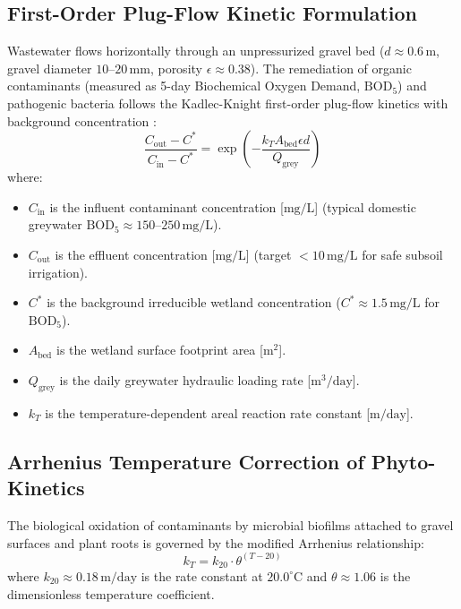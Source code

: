 \subsection{First-Order Plug-Flow Kinetic Formulation}

Wastewater flows horizontally through an unpressurized gravel bed ($d \approx 0.6\,\mathrm{m}$, gravel diameter $10$--$20\,\mathrm{mm}$, porosity $\epsilon \approx 0.38$). The remediation of organic contaminants (measured as 5-day Biochemical Oxygen Demand, $\mathrm{BOD}_5$) and pathogenic bacteria follows the Kadlec-Knight first-order plug-flow kinetics with background concentration \cite{kadlec2008treatment}:
\begin{equation}
\frac{C_{\mathrm{out}} - C^*}{C_{\mathrm{in}} - C^*} = \exp\left( -\frac{k_T A_{\mathrm{bed}} \epsilon d}{Q_{\mathrm{grey}}} \right)
\label{eq:kadlec_knight}
\end{equation}
where:
\begin{itemize}
    \item $C_{\mathrm{in}}$ is the influent contaminant concentration [$\mathrm{mg/L}$] (typical domestic greywater $\mathrm{BOD}_5 \approx 150$--$250\,\mathrm{mg/L}$).
    \item $C_{\mathrm{out}}$ is the effluent concentration [$\mathrm{mg/L}$] (target $<10\,\mathrm{mg/L}$ for safe subsoil irrigation).
    \item $C^*$ is the background irreducible wetland concentration ($C^* \approx 1.5\,\mathrm{mg/L}$ for $\mathrm{BOD}_5$).
    \item $A_{\mathrm{bed}}$ is the wetland surface footprint area [$\mathrm{m^2}$].
    \item $Q_{\mathrm{grey}}$ is the daily greywater hydraulic loading rate [$\mathrm{m^3/day}$].
    \item $k_T$ is the temperature-dependent areal reaction rate constant [$\mathrm{m/day}$].
\end{itemize}

\subsection{Arrhenius Temperature Correction of Phyto-Kinetics}

The biological oxidation of contaminants by microbial biofilms attached to gravel surfaces and plant roots is governed by the modified Arrhenius relationship:
\begin{equation}
k_T = k_{20} \cdot \theta^{(T - 20)}
\label{eq:arrhenius_wetland}
\end{equation}
where $k_{20} \approx 0.18\,\mathrm{m/day}$ is the rate constant at $20.0^\circ\mathrm{C}$ and $\theta \approx 1.06$ is the dimensionless temperature coefficient.

